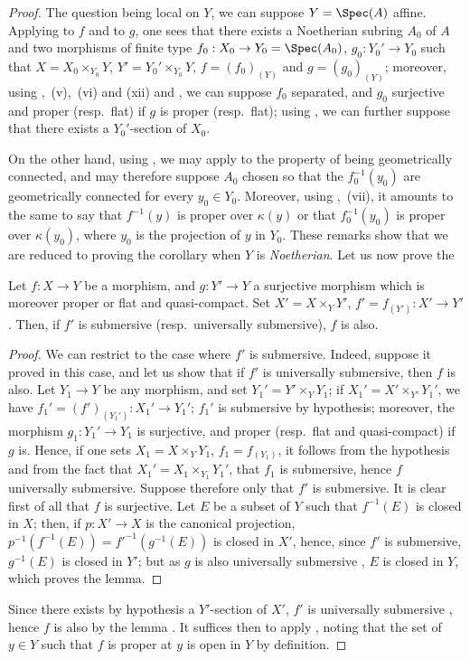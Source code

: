 \begin{proof}
The question being local on $Y$, we can suppose $Y=\Spec(A)$ affine.
Applying  to $f$ and to $g$, one sees that there exists a Noetherian subring $A_0$ of $A$ and two morphisms of finite type $f_0:X_0\to Y_0=\Spec(A_0)$, $g_0:Y_0'\to Y_0$ such that $X=X_0\times_{Y_0}Y$, $Y'=Y_0'\times_{Y_0}Y$, $f=(f_0)_{(Y)}$ and $g=(g_0)_{(Y)}$; moreover, using ,~(v),~(vi) and (xii) and , we can suppose $f_0$ separated, and $g_0$ surjective and proper (resp.\ flat) if $g$ is proper (resp.\ flat); using , we can further suppose that there exists a $Y_0'$-section of $X_0$.

On the other hand, using , we may apply  to the property of being geometrically connected, and may therefore suppose $A_0$ chosen so that the $f_0^{-1}(y_0)$ are geometrically connected for every $y_0\in Y_0$.
Moreover, using ,~(vii), it amounts to the same to say that $f^{-1}(y)$ is proper over $\kappa(y)$ or that $f_0^{-1}(y_0)$ is proper over $\kappa(y_0)$, where $y_0$ is the projection of $y$ in $Y_0$.
These remarks show that we are reduced to proving the corollary when $Y$ is \emph{Noetherian}.
Let us now prove the

\begin{lemma}[15.7.11.1]
\label{IV.15.7.11.1}
Let $f:X\to Y$ be a morphism, and $g:Y'\to Y$ a surjective morphism which is moreover proper or flat and quasi-compact.
Set $X'=X\times_Y Y'$, $f'=f_{(Y')}:X'\to Y'$.
Then, if $f'$ is submersive (resp.\ universally submersive), $f$ is also.
\end{lemma}

\begin{proof}
We can restrict to the case where $f'$ is submersive.
Indeed, suppose it proved in this case, and let us show that if $f'$ is universally submersive, then $f$ is also.
Let $Y_1\to Y$ be any morphism, and set $Y_1'=Y'\times_Y Y_1$; if $X_1'=X'\times_{Y'} Y_1'$, we have $f_1'=(f')_{(Y_1')}:X_1'\to Y_1'$; $f_1'$ is submersive by hypothesis; moreover, the morphism $g_1:Y_1'\to Y_1$ is surjective, and proper (resp.\ flat and quasi-compact) if $g$ is.
Hence, if one sets $X_1=X\times_Y Y_1$, $f_1=f_{(Y_1)}$, it follows from the hypothesis and from the fact that $X_1'=X_1\times_{Y_1} Y_1'$, that $f_1$ is submersive, hence $f$ universally submersive.
Suppose therefore only that $f'$ is submersive.
It is clear first of all that $f$ is surjective.
Let $E$ be a subset of $Y$ such that $f^{-1}(E)$ is closed in $X$; then, if $p:X'\to X$ is the canonical projection,
$p^{-1}(f^{-1}(E))=f'^{-1}(g^{-1}(E))$ is closed in $X'$, hence, since $f'$ is submersive, $g^{-1}(E)$ is closed in $Y'$; but as $g$ is also universally submersive , $E$ is closed in $Y$, which proves the lemma.
\end{proof}

Since there exists by hypothesis a $Y'$-section of $X'$, $f'$ is universally submersive , hence $f$ is also by the lemma .
It suffices then to apply , noting that the set of $y\in Y$ such that $f$ is proper at $y$ is open in $Y$ by definition.
\end{proof}


